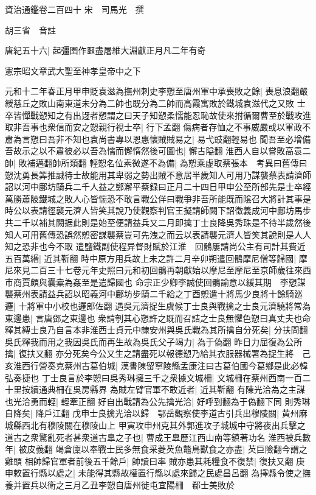 資治通鑑卷二百四十
宋　司馬光　撰

胡三省　音註

唐紀五十六|{
	起彊圉作噩盡屠維大淵獻正月凡二年有奇}


憲宗昭文章武大聖至神孝皇帝中之下

元和十二年春正月甲申貶袁滋為撫州刺史李愬至唐州軍中承喪敗之餘|{
	喪息浪翻嚴綬慈丘之敗山南東道未分為二帥也既分為二帥而高霞寓敗於鐵城袁滋代之又敗}
士卒皆憚戰愬知之有出迓者愬謂之曰天子知愬柔懦能忍恥故使來拊循爾曹至於戰攻進取非吾事也衆信而安之愬親行視士卒|{
	行下孟翻}
傷病者存恤之不事威嚴或以軍政不肅為言愬曰吾非不知也袁尚書專以恩惠懷賊賊易之|{
	易弋豉翻輕易也}
聞吾至必增備吾故示之以不肅彼必以吾為懦而懈惰然後可圖也|{
	懈古隘翻}
淮西人自以嘗敗高袁二帥|{
	敗補邁翻帥所類翻}
輕愬名位素微遂不為備|{
	為愬乘虚取蔡張本　考異曰舊傳曰愬沈勇長筭推誠待士故能用其卑弱之勢出賊不意居半歲知人可用乃謀襲蔡表請濟師詔以河中鄜坊騎兵二千人益之鄭澥平蔡録曰正月二十四日甲申公至所部先是士卒經萬勝蕭陂鐵城之敗人心皆惴恐不敢言戰公佯曰戰爭非吾所能既而隂召大將計其事是時公以表請徑襲元濟人皆笑其說乃使觀察判官王擬請師闕下詔徵義成河中鄜坊馬步共二千以補其闕据此則是始至便請益兵又二月即擒丁士良降吳秀珠是不待半歲然後知人可用舊傳恐誤然愬密謀襲蔡豈可先洩之而云以表請襲元濟人皆笑其說則是人人知之恐非也今不取}
遣鹽鐵副使程异督財賦於江淮　回鶻屢請尚公主有司計其費近五百萬緡|{
	近其靳翻}
時中原方用兵故上未之許二月辛卯朔遣回鶻摩尼僧等歸國|{
	摩尼來見二百三十七卷元年史照曰元和初回鶻再朝獻始以摩尼至摩尼至京師歲往來西市商賈頗與囊槖為姦至是遣歸國也}
命宗正少卿李誠使回鶻諭意以緩其期　李愬謀襲蔡州表請益兵詔以昭義河中鄜坊步騎二千給之丁酉愬遣十將馬少良將十餘騎廵邏|{
	十將軍中小校也邏郎佐翻}
遇吳元濟捉生虞候丁士良與戰擒之士良元濟驍將常為東邊患|{
	言唐鄧之東邊也}
衆請刳其心愬許之既而召詰之士良無懼色愬曰真丈夫也命釋其縛士良乃自言本非淮西士貞元中隸安州與吳氏戰為其所擒自分死矣|{
	分扶問翻}
吳氏釋我而用之我因吳氏而再生故為吳氏父子竭力|{
	為于偽翻}
昨日力屈復為公所擒|{
	復扶又翻}
亦分死矣今公又生之請盡死以報德愬乃給其衣服器械署為捉生將　己亥淮西行營奏克蔡州古葛伯城|{
	漢書陳留寧陵縣孟康注曰古葛伯國今葛鄉是此必韓弘奏捷也}
丁士良言於李愬曰吳秀琳擁三千之衆據文城柵|{
	文城柵在蔡州西南一百二十里按續通典柵在吳房縣界}
為賊左臂官軍不敢近者|{
	近其靳翻}
有陳光洽為之主謀也光洽勇而輕|{
	輕牽正翻}
好自出戰請為公先擒光洽|{
	好呼到翻為于偽翻下同}
則秀琳自降矣|{
	降戶江翻}
戊申士良擒光洽以歸　鄂岳觀察使李道古引兵出穆陵關|{
	黄州麻城縣西北有穆陵關在穆陵山上}
甲寅攻申州克其外郭進攻子城城中守將夜出兵擊之道古之衆驚亂死者甚衆道古臯之子也|{
	曹成王臯歷江西山南等鎮著功名}
淮西被兵數年|{
	被皮義翻}
竭倉廩以奉戰士民多無食采菱芡魚鼈鳥獸食之亦盡|{
	芡巨險翻今謂之雞頭}
相帥歸官軍者前後五千餘戶|{
	帥讀曰率}
賊亦患其耗糧食不復禁|{
	復扶又翻}
庚申敕置行縣以處之|{
	未能得其縣故權置行縣以處來歸之民處昌呂翻}
為擇縣令使之撫養并置兵以衛之三月乙丑李愬自唐州徙屯宜陽柵　郗士美敗於

